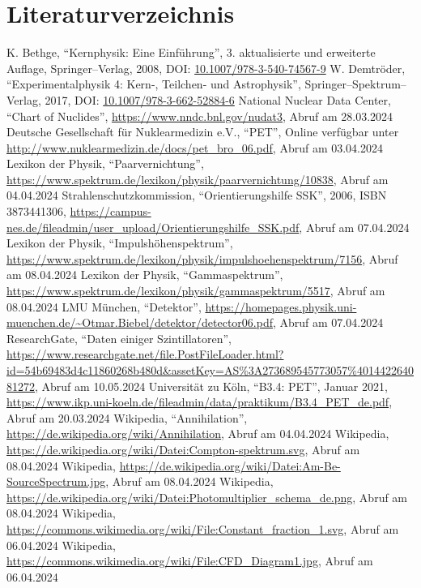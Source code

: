 \documentclass[12pt,a4paper]{scrartcl}
\numberwithin{equation}{section} %
\begin{document}
\clearpage
\hypertarget{literatur}{\section{Literaturverzeichnis}\label{literatur}}
\renewcommand{\section}[2]{}

\begin{thebibliography}{99}
	K. Bethge, ``Kernphysik: Eine Einführung'', 3. aktualisierte und
	erweiterte Auflage, Springer--Verlag, 2008, DOI:
	\href{https://doi.org/10.1007/978-3-540-74567-9}{10.1007/978-3-540-74567-9}
	W. Demtröder, ``Experimentalphysik 4: Kern-, Teilchen- und
	Astrophysik'', Springer--Spektrum--Verlag, 2017, DOI:
	\href{https://link.springer.com/book/10.1007/978-3-662-52884-6}{10.1007/978-3-662-52884-6}
	National Nuclear Data Center, ``Chart of Nuclides'',
	\url{https://www.nndc.bnl.gov/nudat3}, Abruf am 28.03.2024
	Deutsche Gesellschaft für Nuklearmedizin e.V., ``PET'',
	Online verfügbar unter
	\url{http://www.nuklearmedizin.de/docs/pet_bro_06.pdf},
	Abruf am 03.04.2024
	Lexikon der Physik, ``Paarvernichtung'',
	\url{https://www.spektrum.de/lexikon/physik/paarvernichtung/10838},
	Abruf am 04.04.2024
	Strahlenschutzkommission, ``Orientierungshilfe SSK'', 2006, ISBN 3873441306,
	\url{https://campus-nes.de/fileadmin/user_upload/Orientierungshilfe_SSK.pdf}, Abruf am 07.04.2024
	Lexikon der Physik, ``Impulshöhenspektrum'',
	\url{https://www.spektrum.de/lexikon/physik/impulshoehenspektrum/7156},
	Abruf am 08.04.2024
	Lexikon der Physik, ``Gammaspektrum'',
	\url{https://www.spektrum.de/lexikon/physik/gammaspektrum/5517},
	Abruf am 08.04.2024
	LMU München, ``Detektor'',
	\url{https://homepages.physik.uni-muenchen.de/~Otmar.Biebel/detektor/detector06.pdf},
	Abruf am 07.04.2024
	ResearchGate, ``Daten einiger Szintillatoren'',
	\url{https://www.researchgate.net/file.PostFileLoader.html?id=54b69483d4c11860268b480d&assetKey=AS%3A273689545773057%401442264081272},
	Abruf am 10.05.2024
	Universität zu Köln, ``B3.4: PET'',
	Januar 2021,
	\url{https://www.ikp.uni-koeln.de/fileadmin/data/praktikum/B3.4\_PET\_de.pdf},
	Abruf am 20.03.2024
	Wikipedia, ``Annihilation'',
	\url{https://de.wikipedia.org/wiki/Annihilation}, Abruf am 04.04.2024
	Wikipedia,
	\url{https://de.wikipedia.org/wiki/Datei:Compton-spektrum.svg},
	Abruf am 08.04.2024
	Wikipedia,
	\url{https://de.wikipedia.org/wiki/Datei:Am-Be-SourceSpectrum.jpg},
	Abruf am 08.04.2024
	Wikipedia,
	\url{https://de.wikipedia.org/wiki/Datei:Photomultiplier_schema_de.png},
	Abruf am 08.04.2024
	Wikipedia,
	\url{https://commons.wikimedia.org/wiki/File:Constant_fraction_1.svg},
	Abruf am 06.04.2024
	Wikipedia,
	\url{https://commons.wikimedia.org/wiki/File:CFD_Diagram1.jpg},
	Abruf am 06.04.2024
\end{thebibliography}
\end{document}
